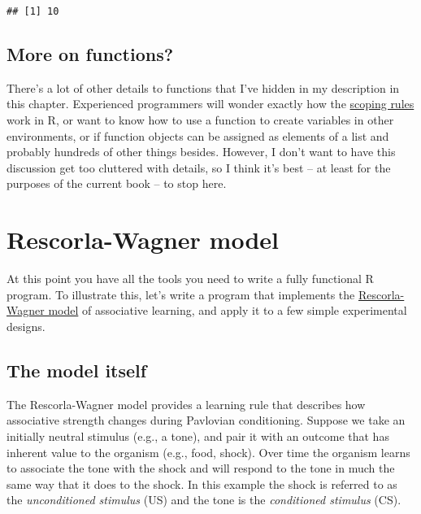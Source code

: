 \documentclass[]{book}
\begin{document}
\begin{verbatim}
## [1] 10
\end{verbatim}

\hypertarget{more-on-functions}{%
\subsection{More on functions?}\label{more-on-functions}}

There's a lot of other details to functions that I've hidden in my description in this chapter. Experienced programmers will wonder exactly how the \href{https://bookdown.org/rdpeng/rprogdatascience/scoping-rules-of-r.html}{scoping rules} work in R, or want to know how to use a function to create variables in other environments, or if function objects can be assigned as elements of a list and probably hundreds of other things besides. However, I don't want to have this discussion get too cluttered with details, so I think it's best -- at least for the purposes of the current book -- to stop here.

\hypertarget{rescorla-wagner-model}{%
\section{Rescorla-Wagner model}\label{rescorla-wagner-model}}

At this point you have all the tools you need to write a fully functional R program. To illustrate this, let's write a program that implements the \href{http://www.scholarpedia.org/article/Rescorla-Wagner_model}{Rescorla-Wagner model} of associative learning, and apply it to a few simple experimental designs.

\hypertarget{the-model-itself}{%
\subsection{The model itself}\label{the-model-itself}}

The Rescorla-Wagner model provides a learning rule that describes how associative strength changes during Pavlovian conditioning. Suppose we take an initially neutral stimulus (e.g., a tone), and pair it with an outcome that has inherent value to the organism (e.g., food, shock). Over time the organism learns to associate the tone with the shock and will respond to the tone in much the same way that it does to the shock. In this example the shock is referred to as the \emph{unconditioned stimulus} (US) and the tone is the \emph{conditioned stimulus} (CS).
\end{document}
